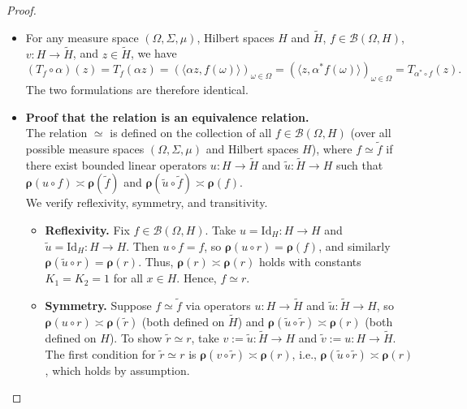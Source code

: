 \documentclass[a4paper,10pt]{article}
\theoremstyle{plain}
\theoremstyle{definition}
\theoremstyle{remark}
\begin{document}
\begin{proof}
  \mbox{} \\
  \begin{itemize}
    \item For any measure space $(\Omega ,\Sigma,\mu)$, Hilbert spaces $H$ and $\tilde{H}$, $f \in \mathsf{\mathcal{B}}(\Omega,H)$, $v : H \to \tilde{H}$, and $z \in \tilde{H}$, we have
          \[ (T_f\circ \alpha)(z)=T_f( \alpha z)=(\langle \alpha z,f(\omega)\rangle)_{\omega\in\Omega}=(\langle z, \alpha^* f(\omega)\rangle)_{\omega\in\Omega}=T_{\alpha^* \circ f}(z). \]
          The two formulations are therefore identical.


    \item \textbf{Proof that the relation is an equivalence relation.} \\
          The relation $\simeq$ is defined on the collection of all $f \in \mathsf{\mathcal{B}}(\Omega,H)$ (over all possible measure spaces $(\Omega,\Sigma,\mu)$ and Hilbert spaces $H$), where $f\simeq\tilde{f}$ if there exist bounded linear operators $u:H\to\tilde{H}$ and $\tilde{u}:\tilde{H}\to H$ such that $\boldsymbol{\rho}(u\circ f)\asymp\boldsymbol{\rho}(\tilde{f})$ and $\boldsymbol{\rho}(\tilde{u}\circ\tilde{f})\asymp\boldsymbol{\rho}(f)$. \\
          We verify reflexivity, symmetry, and transitivity.
          \begin{itemize}
            \item \textbf{Reflexivity.}  Fix $f\in \mathsf{\mathcal{B}}(\Omega,H)$. Take $u=\mathrm{Id}_H:H\to H$ and $\tilde{u}=\mathrm{Id}_H:H\to H$. Then $u\circ f=f$, so $\boldsymbol{\rho}(u\circ r)=\boldsymbol{\rho}(f)$, and similarly $\boldsymbol{\rho}(\tilde{u}\circ r)=\boldsymbol{\rho}(r)$. Thus, $\boldsymbol{\rho}(r)\asymp\boldsymbol{\rho}(r)$ holds with constants $K_1=K_2=1$ for all $x\in H$. Hence, $f\simeq r$.
            \item \textbf{Symmetry.}  Suppose $f\simeq\tilde{f}$ via operators $u:H\to\tilde{H}$ and $\tilde{u}:\tilde{H}\to H$, so $\boldsymbol{\rho}(u\circ r)\asymp\boldsymbol{\rho}(\tilde{r})$ (both defined on $\tilde{H}$) and $\boldsymbol{\rho}(\tilde{u}\circ\tilde{r})\asymp\boldsymbol{\rho}(r)$ (both defined on $H$). To show $\tilde{r}\simeq r$, take $v:=\tilde{u}:\tilde{H}\to H$ and $\tilde{v}:=u:H\to\tilde{H}$. \\
                  The first condition for $\tilde{r}\simeq r$ is $\boldsymbol{\rho}(v\circ\tilde{r})\asymp\boldsymbol{\rho}(r)$, i.e., $\boldsymbol{\rho}(\tilde{u}\circ\tilde{r})\asymp\boldsymbol{\rho}(r)$, which holds by assumption. \\

\end{itemize}
\end{itemize}
\end{proof}
\end{document}
